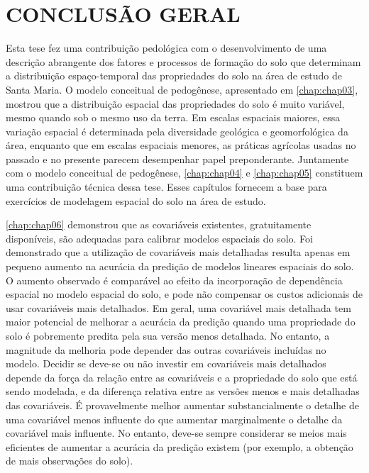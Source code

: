 \artigofalse
\chapter{CONCLUSÃO GERAL}
\label{appen:conclusion-pt}

Esta tese fez uma contribuição pedológica com o desenvolvimento de uma descrição abrangente dos fatores e 
processos de formação do solo que determinam a distribuição espaço-temporal das propriedades do solo na área 
de estudo de Santa Maria. O modelo conceitual de pedogênese, apresentado em \autoref{chap:chap03}, 
mostrou que a distribuição espacial das propriedades do solo é muito variável, mesmo quando sob o mesmo uso da 
terra. Em escalas espaciais maiores, essa variação espacial é determinada pela diversidade geológica e 
geomorfológica da área, enquanto que em escalas espaciais menores, as práticas agrícolas usadas no passado e 
no presente parecem desempenhar papel preponderante. Juntamente com o modelo conceitual de pedogênese, 
\autoref{chap:chap04} e \autoref{chap:chap05} constituem uma contribuição técnica dessa tese. Esses capítulos 
fornecem a base para exercícios de modelagem espacial do solo na área de estudo.

\autoref{chap:chap06} demonstrou que as covariáveis existentes, gratuitamente disponíveis, são adequadas para 
calibrar modelos espaciais do solo. Foi demonstrado que a utilização de covariáveis mais detalhadas resulta 
apenas em pequeno aumento na acurácia da predição de modelos lineares espaciais do solo. O aumento observado é 
comparável ao efeito da incorporação de dependência espacial no modelo espacial do solo, e pode não compensar 
os custos adicionais de usar covariáveis mais detalhados. Em geral, uma covariável mais detalhada tem maior 
potencial de melhorar a acurácia da predição quando uma propriedade do solo é pobremente predita pela sua 
versão menos detalhada. No entanto, a magnitude da melhoria pode depender das outras covariáveis 
incluídas no modelo. Decidir se deve-se ou não investir em covariáveis mais detalhados depende da força da 
relação entre as covariáveis e a propriedade do solo que está sendo modelada, e da diferença relativa entre as 
versões menos e mais detalhadas das covariáveis. É provavelmente melhor aumentar substancialmente o detalhe de 
uma covariável menos influente do que aumentar marginalmente o detalhe da covariável mais influente. No 
entanto, deve-se sempre considerar se meios mais eficientes de aumentar a acurácia da predição existem (por 
exemplo, a obtenção de mais observações do solo).

